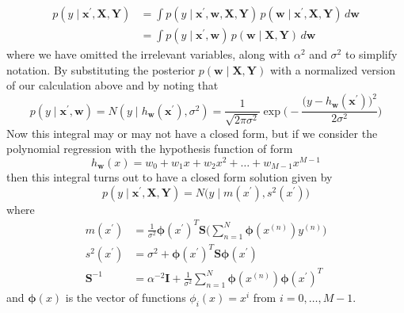    \begin{align*}
        p(y \mid \mathbf{x}^\prime, \mathbf{X}, \mathbf{Y}) & = \int p(y \mid \mathbf{x}^\prime, \mathbf{w}, \mathbf{X}, \mathbf{Y}) \, p(\mathbf{w} \mid \mathbf{x}^\prime, \mathbf{X}, \mathbf{Y}) \, d \mathbf{w} \\
        & = \int p(y \mid \mathbf{x}^\prime, \mathbf{w}) \, p(\mathbf{w} \mid \mathbf{X}, \mathbf{Y}) \, d \mathbf{w} 
    \end{align*}
    where we have omitted the irrelevant variables, along with $\alpha^2$ and $\sigma^2$ to simplify notation. By substituting the posterior $p(\mathbf{w} \mid \mathbf{X}, \mathbf{Y})$ with a normalized version of our calculation above and by noting that 
    \[p(y \mid \mathbf{x}^\prime, \mathbf{w}) = N(y \mid h_\mathbf{w} (\mathbf{x}^\prime), \sigma^2) = \frac{1}{\sqrt{2 \pi \sigma^2}} \exp \bigg( -\frac{\big(y - h_\mathbf{w} (\mathbf{x}^\prime)\big)^2}{2 \sigma^2} \bigg)\]
    Now this integral may or may not have a closed form, but if we consider the polynomial regression with the hypothesis function of form 
    \[h_\mathbf{w} (x) = w_0 + w_1 x + w_2 x^2 + \ldots + w_{M-1} x^{M-1}\]
    then this integral turns out to have a closed form solution given by 
    \[p(y \mid \mathbf{x}^\prime, \mathbf{X}, \mathbf{Y}) = N \big( y \mid m(x^\prime), s^2 (x^\prime)\big)\]
    where 
    \begin{align*}
        m(x^\prime) & = \frac{1}{\sigma^2} \boldsymbol{\phi}(x^\prime)^T \mathbf{S} \bigg( \sum_{n=1}^N \boldsymbol{\phi}(x^{(n)}) y^{(n)} \bigg) \\
        s^2 (x^\prime) & = \sigma^2 + \boldsymbol{\phi}(x^\prime)^T \mathbf{S} \boldsymbol{\phi}(x^\prime) \\
        \mathbf{S}^{-1} & = \alpha^{-2} \mathbf{I} + \frac{1}{\sigma^2} \sum_{n=1}^N \boldsymbol{\phi}(x^{(n)}) \boldsymbol{\phi}(x^\prime)^T 
    \end{align*}
    and $\boldsymbol{\phi}(x)$ is the vector of functions $\phi_i (x) = x^i$ from $i = 0, \ldots, M-1$. 

